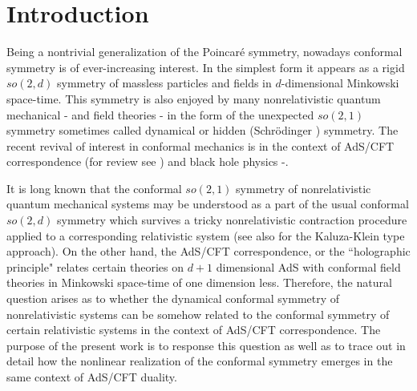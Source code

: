\documentclass[a4paper,12pt]{article}
\begin{document}
\bigskip
\section{\protect\bigskip Introduction}


Being a nontrivial
generalization of
the Poincar\'e symmetry, nowadays conformal symmetry
is of ever-increasing interest.
In the simplest form it appears as a
rigid $so(2,d)$
symmetry  of massless particles
and fields in $d$-dimensional Minkowski space-time.
This symmetry is also enjoyed by many
nonrelativistic quantum mechanical
\cite{AFF}-\cite{dgh}
and field theories \cite{Hag}-\cite{OR}
in the form of the unexpected $so(2,1)$ symmetry
sometimes called dynamical or hidden
(Schr\"odinger ) symmetry.
The recent revival of interest in conformal mechanics
is in the context of AdS/CFT correspondence
\cite{Mald,Gubs,WitE} (for review see \cite{Ahar})
and black hole physics \cite{kallosh}-\cite{Bell}.

It is long known that the
conformal $so(2,1)$ symmetry of nonrelativistic
quantum mechanical systems
may be understood  as a part
of the usual conformal $so(2,d)$ symmetry
which survives a tricky nonrelativistic
contraction procedure
applied to a corresponding relativistic
system \cite{BaRa}
(see also \cite{dgh,hh} for the Kaluza-Klein type approach).
On the other hand,
the AdS/CFT correspondence, or the ``holographic principle"
relates certain theories
on $d+1$ dimensional AdS with conformal field theories in
Minkowski space-time of one dimension less.
Therefore, the natural question arises as to whether the
dynamical conformal symmetry of nonrelativistic systems
can be somehow related to the conformal symmetry
of certain relativistic systems in the
context of AdS/CFT correspondence.
The purpose of the present work is to response
this question as well as to trace out in detail
how the nonlinear realization of the conformal symmetry
emerges in the same
context of AdS/CFT duality.
\end{document}
